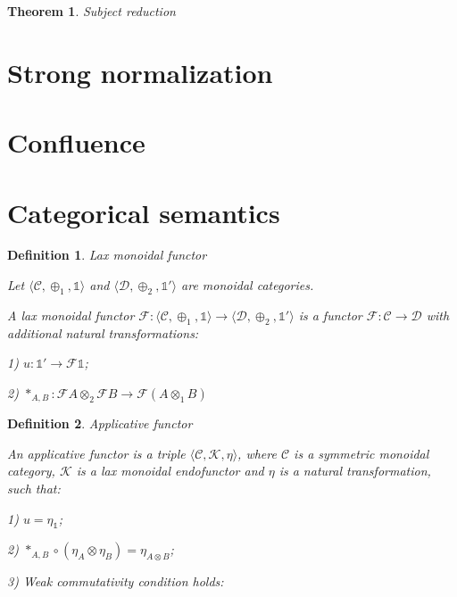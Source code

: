 \documentclass[a4paper]{article}
\newtheorem{theorem}{Theorem}
\newtheorem{defin}{Definition}
\begin{document}
\begin{theorem} Subject reduction
\end{theorem}


\section{Strong normalization}

\section{Confluence}

\section{Categorical semantics}

\begin{defin} Lax monoidal functor

  Let $\langle \mathcal{C}, \oplus_1, \mathds{1} \rangle$ and $\langle \mathcal{D}, \oplus_2, \mathds{1}' \rangle$ are monoidal categories.

  A lax monoidal functor $\mathcal{F} : \langle \mathcal{C}, \oplus_1, \mathds{1} \rangle \to \langle \mathcal{D}, \oplus_2, \mathds{1}' \rangle$ is a functor
  $\mathcal{F} : \mathcal{C} \to \mathcal{D}$ with additional natural transformations:

  1) $u : \mathds{1}' \to \mathcal{F}\mathds{1}$;

  2) $\ast_{A, B} : \mathcal{F}A \otimes_2 \mathcal{F}B \to \mathcal{F}(A \otimes_1 B)$

\end{defin}

\begin{defin} Applicative functor

  An applicative functor is a triple $\langle \mathcal{C}, \mathcal{K}, \eta \rangle$,
where $\mathcal{C}$ is a symmetric monoidal category, $\mathcal{K}$ is a lax monoidal endofunctor and $\eta$ is a natural transformation, such that:

1) $u = \eta_{\mathds{1}}$;

2) $\ast_{A,B} \circ (\eta_A \otimes \eta_B) = \eta_{A \otimes B}$;

3) Weak commutativity condition holds:

\end{defin}
\end{document}
